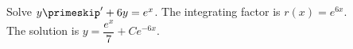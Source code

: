 {Solve $y\primeskip' + 6y = e^x$.}
{The integrating factor is $r(x)=e^{6x}$. \\
The solution is $y=\dfrac{e^x}{7}+Ce^{-6x}$.}